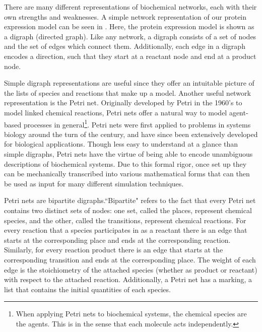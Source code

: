 There are many different representations of biochemical networks, each with their own strengths and weaknesses. A simple network representation of our protein expression model can be seen in . Here, the protein expression model is shown as a digraph (directed graph). Like any network, a digraph consists of a set of nodes and the set of edges which connect them. Additionally, each edge in a digraph encodes a direction, such that they start at a reactant node and end at a product node.

Simple digraph representations are useful since they offer an intuitable picture of the lists of species and reactions that make up a model. Another useful network representation is the Petri net. Originally developed by Petri in the 1960's\supercite{Petri:1966vs} to model linked chemical reactions, Petri nets offer a natural way to model agent-based processes in general\footnote{When applying Petri nets to biochemical systems, the chemical species are the agents. This is in the sense that each molecule acts independently.}. Petri nets were first applied to problems in systems biology around the turn of the century\supercite{Goss:1998tf}, and have since been extensively developed for biological applications\supercite{Pinney:2003tz,Hardy:2004tq,Haas:2006ts}. Though less easy to understand at a glance than simple digraphs, Petri nets have the virtue of being able to encode unambiguous descriptions of biochemical systems. Due to this formal rigor, once set up they can be mechanically transcribed into various mathematical forms that can then be used as input for many different simulation techniques.

Petri nets are bipartite digraphs.``Bipartite" refers to the fact that every Petri net contains two distinct sets of nodes: one set, called the places, represent chemical species, and the other, called the transitions, represent chemical reactions. For every reaction that a species participates in as a reactant there is an edge that starts at the corresponding place and ends at the corresponding reaction. Similarly, for every reaction product there is an edge that starts at the corresponding transition and ends at the corresponding place. The weight of each edge is the stoichiometry of the attached species (whether as product or reactant) with respect to the attached reaction. Additionally, a Petri net has a marking, a list that contains the initial quantities of each species.

